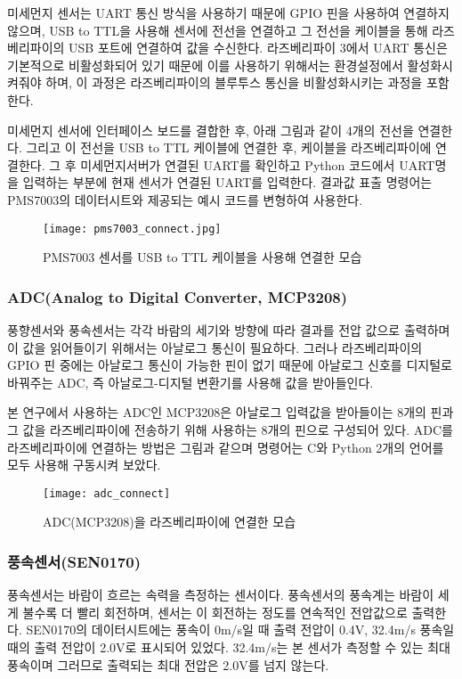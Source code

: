미세먼지 센서는 UART 통신 방식을 사용하기 때문에 GPIO 핀을 사용하여 연결하지 않으며, USB to TTL을 사용해 센서에 전선을 연결하고 그 전선을 케이블을 통해 라즈베리파이의 USB 포트에 연결하여 값을 수신한다. 라즈베리파이 3에서 UART 통신은 기본적으로 비활성화되어 있기 때문에 이를 사용하기 위해서는 환경설정에서 활성화시켜줘야 하며, 이 과정은 라즈베리파이의 블루투스 통신을 비활성화시키는 과정을 포함한다.

미세먼지 센서에 인터페이스 보드를 결합한 후, 아래 그림과 같이 4개의 전선을 연결한다. 그리고 이 전선을 USB to TTL 케이블에 연결한 후, 케이블을 라즈베리파이에 연결한다. 그 후 미세먼지서버가 연결된 UART를 확인하고 Python 코드에서 UART명을 입력하는 부분에 현재 센서가 연결된 UART를 입력한다. 결과값 표출 명령어는 PMS7003의 데이터시트와 제공되는 예시 코드를 변형하여 사용한다.

\begin{figure}[htbp]
	\centering
	\texttt{[image: pms7003\_connect.jpg]}
	\caption{PMS7003 센서를 USB to TTL 케이블을 사용해 연결한 모습}
	\label{PMS7003}
\end{figure}

\subsubsection{ADC(Analog to Digital Converter, MCP3208)}
풍향센서와 풍속센서는 각각 바람의 세기와 방향에 따라 결과를 전압 값으로 출력하며 이 값을 읽어들이기 위해서는 아날로그 통신이 필요하다. 그러나 라즈베리파이의 GPIO 핀 중에는 아날로그 통신이 가능한 핀이 없기 때문에 아날로그 신호를 디지털로 바꿔주는 ADC, 즉 아날로그-디지털 변환기를 사용해 값을 받아들인다. 

본 연구에서 사용하는 ADC인 MCP3208은 아날로그 입력값을 받아들이는 8개의 핀과 그 값을 라즈베리파이에 전송하기 위해 사용하는 8개의 핀으로 구성되어 있다. ADC를 라즈베리파이에 연결하는 방법은 그림과 같으며 명령어는 C와 Python 2개의 언어를 모두 사용해 구동시켜 보았다.

\begin{figure}[htbp]
	\centering
	\texttt{[image: adc\_connect]}
	\caption{ADC(MCP3208)을 라즈베리파이에 연결한 모습}
	\label{ADCCON}
\end{figure}

\subsubsection{풍속센서(SEN0170)}
풍속센서는 바람이 흐르는 속력을 측정하는 센서이다. 풍속센서의 풍속계는 바람이 세게 불수록 더 빨리 회전하며, 센서는 이 회전하는 정도를 연속적인 전압값으로 출력한다. SEN0170의 데이터시트에는 풍속이 0m/s일 때 출력 전압이 0.4V, 32.4m/s 풍속일 때의 출력 전압이 2.0V로 표시되어 있었다. 32.4m/s는 본 센서가 측정할 수 있는 최대 풍속이며 그러므로 출력되는 최대 전압은 2.0V를 넘지 않는다. 

